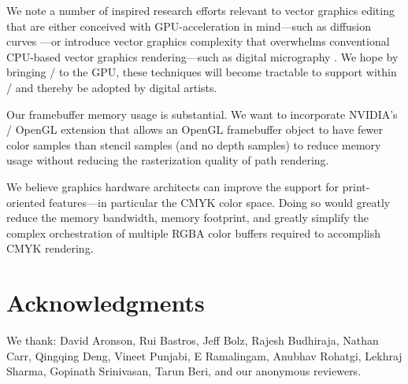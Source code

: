 We note a number of inspired research efforts relevant to vector
graphics editing that are either conceived with GPU-acceleration
in mind---such as diffusion curves \cite{Andronikos2013}---or
introduce vector graphics complexity that overwhelms conventional
CPU-based vector graphics rendering---such as digital micrography
\cite{Maharik:2011:DM:2010324.1964995}.  We hope by bringing
\Illustrator/ to the GPU, these techniques will become tractable to
support within \Illustrator/ and thereby be adopted by digital artists.

Our framebuffer memory usage is substantial.  We want to incorporate
NVIDIA's \NVfms/ OpenGL
extension \cite{FramebufferMixedSamples}
that allows an OpenGL framebuffer object to have fewer color
samples than stencil samples (and no depth samples) to reduce memory usage without reducing
the rasterization quality of path rendering.  

We believe graphics hardware architects can improve the support for
print-oriented features---in particular the CMYK color space.  Doing so
would greatly reduce the memory bandwidth, memory footprint, and greatly
simplify the complex orchestration of multiple RGBA color buffers required
to accomplish CMYK rendering.

\ifreviewelse
{}
{
\section*{Acknowledgments}

We thank:
David Aronson,
Rui Bastros,
Jeff Bolz,
Rajesh Budhiraja,
Nathan Carr,
Qingqing Deng,
Vineet Punjabi,
E Ramalingam,
Anubhav Rohatgi,
Lekhraj Sharma,
Gopinath Srinivasan,
Tarun Beri,
and our anonymous reviewers.
}
